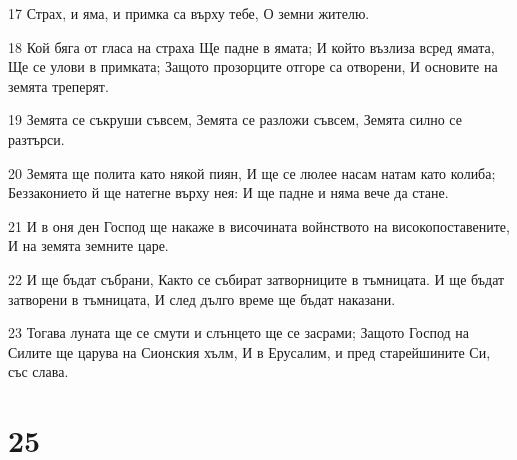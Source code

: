 \par 17 Страх, и яма, и примка са върху тебе, О земни жителю.
\par 18 Кой бяга от гласа на страха Ще падне в ямата; И който възлиза всред ямата, Ще се улови в примката; Защото прозорците отгоре са отворени, И основите на земята треперят.
\par 19 Земята се съкруши съвсем, Земята се разложи съвсем, Земята силно се разтърси.
\par 20 Земята ще полита като някой пиян, И ще се люлее насам натам като колиба; Беззаконието й ще натегне върху нея: И ще падне и няма вече да стане.
\par 21 И в оня ден Господ ще накаже в височината войнството на високопоставените, И на земята земните царе.
\par 22 И ще бъдат събрани, Както се събират затворниците в тъмницата. И ще бъдат затворени в тъмницата, И след дълго време ще бъдат наказани.
\par 23 Тогава луната ще се смути и слънцето ще се засрами; Защото Господ на Силите ще царува на Сионския хълм, И в Ерусалим, и пред старейшините Си, със слава.

\chapter{25}

